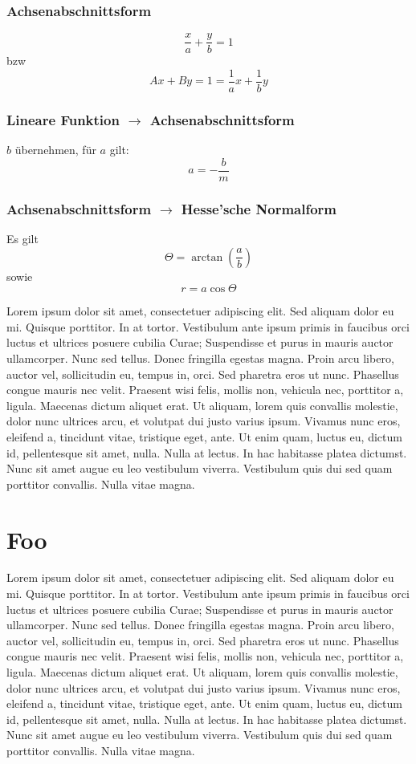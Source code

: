 \subsubsection{Achsenabschnittsform}
\[ \frac{x}{a} + \frac{y}{b} = 1 \] bzw
\[ Ax + By = 1 = \frac{1}{a}x + \frac{1}{b}y \]

\subsubsection{Lineare Funktion $\rightarrow$ Achsenabschnittsform}
$b$ übernehmen, für $a$ gilt:
\[ a = -\frac{b}{m} \]

\subsubsection{Achsenabschnittsform $\rightarrow$ Hesse'sche Normalform}
Es gilt
\[ \Theta = \arctan \left ( \frac{a}{b} \right ) \]
sowie
\[ r = a \cos \Theta \]

Lorem ipsum dolor sit amet, consectetuer adipiscing elit. Sed
aliquam dolor eu mi. Quisque porttitor. In at tortor. Vestibulum
ante ipsum primis in faucibus orci luctus et ultrices posuere
cubilia Curae; Suspendisse et purus in mauris auctor ullamcorper.
Nunc sed tellus. Donec fringilla egestas magna. Proin arcu libero,
auctor vel, sollicitudin eu, tempus in, orci. Sed pharetra eros ut
nunc. Phasellus congue mauris nec velit. Praesent wisi felis, mollis
non, vehicula nec, porttitor a, ligula. Maecenas dictum aliquet
erat. Ut aliquam, lorem quis convallis molestie, dolor nunc ultrices
arcu, et volutpat dui justo varius ipsum. Vivamus nunc eros,
eleifend a, tincidunt vitae, tristique eget, ante. Ut enim quam,
luctus eu, dictum id, pellentesque sit amet, nulla. Nulla at lectus.
In hac habitasse platea dictumst. Nunc sit amet augue eu leo
vestibulum viverra. Vestibulum quis dui sed quam porttitor
convallis. Nulla vitae magna.

\section{Foo}

Lorem ipsum dolor sit amet, consectetuer adipiscing elit. Sed
aliquam dolor eu mi. Quisque porttitor. In at tortor. Vestibulum
ante ipsum primis in faucibus orci luctus et ultrices posuere
cubilia Curae; Suspendisse et purus in mauris auctor ullamcorper.
Nunc sed tellus. Donec fringilla egestas magna. Proin arcu libero,
auctor vel, sollicitudin eu, tempus in, orci. Sed pharetra eros ut
nunc. Phasellus congue mauris nec velit. Praesent wisi felis, mollis
non, vehicula nec, porttitor a, ligula. Maecenas dictum aliquet
erat. Ut aliquam, lorem quis convallis molestie, dolor nunc ultrices
arcu, et volutpat dui justo varius ipsum. Vivamus nunc eros,
eleifend a, tincidunt vitae, tristique eget, ante. Ut enim quam,
luctus eu, dictum id, pellentesque sit amet, nulla. Nulla at lectus.
In hac habitasse platea dictumst. Nunc sit amet augue eu leo
vestibulum viverra. Vestibulum quis dui sed quam porttitor
convallis. Nulla vitae magna.


